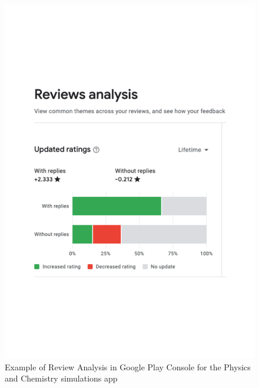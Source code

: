 \begin{figure}
    \centering
    \includegraphics[width=\linewidth]{images/google-play-console/PhET-Review-Analysis-Screenshot-2022-09-07.pdf}
    \caption{Example of Review Analysis in Google Play Console for the Physics and Chemistry simulations app}
    \label{fig:PhET-Review-Analysis-Screenshot-2022-09-07}
\end{figure}

